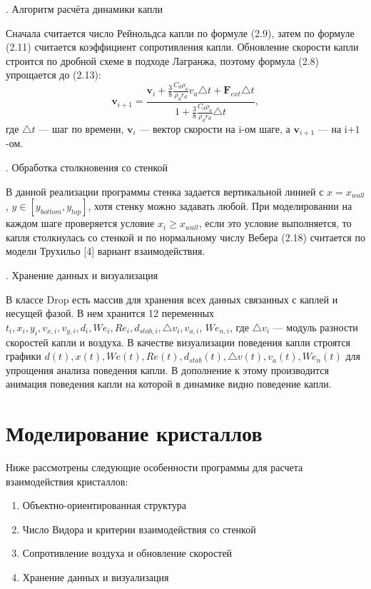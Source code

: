 . Алгоритм расчёта динамики капли

Сначала считается число Рейнольдса капли по формуле (2.9), затем по формуле (2.11) считается коэффициент сопротивления капли. Обновление скорости капли строится по дробной схеме в подходе Лагранжа, поэтому формула (2.8) упрощается до (2.13):
\begin{equation}
	\mathbf{v}_{i+1} = \frac{\mathbf{v}_i+\frac{3}{8}\frac{C_d \rho_a}{\rho_d r_d} v_a \triangle t +\mathbf{F}_{ext} \triangle t}{1+\frac{3}{8}\frac{C_d \rho_a}{\rho_d r_d} \triangle t},
\end{equation}
где $\triangle t$ --- шаг по времени, $\mathbf{v}_i$ --- вектор скорости на i-ом шаге, а $\mathbf{v}_{i+1}$ --- на i$+1$-ом.

. Обработка столкновения со стенкой

В данной реализации программы стенка задается вертикальной линией с $x=x_{wall}$, $y \in [y_{bottom},y_{top}]$, хотя стенку можно задавать любой. При моделировании на каждом шаге проверяется условие $x_i \geq x_{wall}$, если это условие выполняется, то капля столкнулась со стенкой и по нормальному числу Вебера (2.18) считается по модели Трухильо [4] вариант взаимодействия.

. Хранение данных и визуализация

 В классе Drop есть массив для хранения всех данных связанных с каплей и несущей фазой. В нем хранится 12 переменных $t_i, x_i, y_i, v_{x,i},v_{y,i},d_i,We_i,Re_i,d_{stab,i},\triangle v_i,v_{a,i}$, $We_{n,i}$, где $\triangle v_{i}$ --- модуль разности скоростей капли и воздуха. В качестве визуализации поведения капли строятся графики $d(t),x(t),We(t),Re(t),d_{stab}(t),\triangle v(t),v_a(t),We_n(t)$ для упрощения анализа поведения капли. В дополнение к этому производится анимация поведения капли на которой в динамике видно поведение капли.

\section{Моделирование кристаллов}

Ниже рассмотрены следующие особенности программы для расчета взаимодействия кристаллов:

\begin{enumerate}
	\item Объектно-ориентированная структура
	\item Число Видора и критерии взаимодействия со стенкой
	\item Сопротивление воздуха и обновление скоростей
	\item Хранение данных и визуализация
\end{enumerate}

